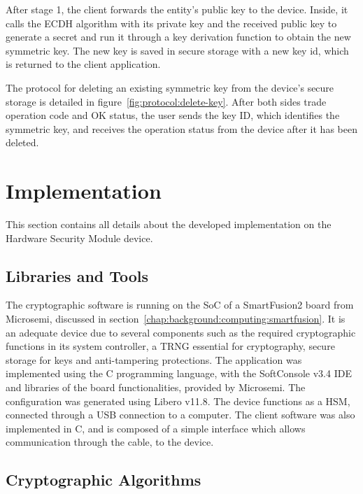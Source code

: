 After stage 1, the client forwards the entity's public key to the device. Inside, it calls the ECDH algorithm with its private key and the received public key to generate a secret and run it through a key derivation function to obtain the new symmetric key.
The new key is saved in secure storage with a new key id, which is returned to the client application.

The protocol for deleting an existing symmetric key from the device's secure storage is detailed in figure~\ref{fig:protocol:delete-key}.
After both sides trade operation code and OK status, the user sends the key ID, which identifies the symmetric key, and receives the operation status from the device after it has been deleted.

\section{Implementation}\label{chap:implementation:app}

This section contains all details about the developed implementation on the Hardware Security Module device.

\subsection{Libraries and Tools}\label{chap:implementation:app:tools}

The cryptographic software is running on the \ac{SoC} of a SmartFusion2 board from Microsemi, discussed in section~\ref{chap:background:computing:smartfusion}. It is an adequate device due to several components such as the required cryptographic functions in its system controller, a \ac{TRNG} essential for cryptography, secure storage for keys and anti-tampering protections.
The application was implemented using the C programming language, with the SoftConsole v3.4 \ac{IDE} and libraries of the board functionalities, provided by Microsemi. The configuration was generated using Libero v11.8. The device functions as a \ac{HSM}, connected through a \ac{USB} connection to a computer.
The client software was also implemented in C, and is composed of a simple interface which allows communication through the cable, to the device.

\subsection{Cryptographic Algorithms}\label{chap:implementation:app:algorithms}

